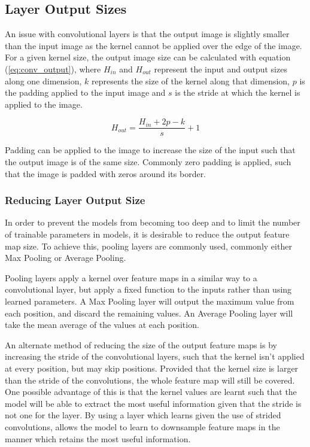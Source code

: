 \subsection{Layer Output Sizes}
An issue with convolutional layers is that the output image is slightly smaller than the input image as the kernel cannot be applied over the edge of the image.
For a given kernel size, the output image size can be calculated with equation (\ref{eq:conv_output}), where $H_{in}$ and $H_{out}$ represent the input and output sizes along one dimension, $k$ represents the size of the kernel along that dimension, $p$ is the padding applied to the input image and $s$ is the stride at which the kernel is applied to the image.

\begin{equation} \label{eq:conv_output}
    H_{out} = \frac{H_{in} + 2p - k}{s} + 1
\end{equation}

Padding can be applied to the image to increase the size of the input such that the output image is of the same size.
Commonly zero padding is applied, such that the image is padded with zeros around its border.

\subsubsection{Reducing Layer Output Size}
In order to prevent the models from becoming too deep and to limit the number of trainable parameters in models, it is desirable to reduce the output feature map size.
To achieve this, pooling layers are commonly used, commonly either Max Pooling or Average Pooling.

Pooling layers apply a kernel over feature maps in a similar way to a convolutional layer, but apply a fixed function to the inputs rather than using learned parameters.
A Max Pooling layer will output the maximum value from each position, and discard the remaining values.
An Average Pooling layer will take the mean average of the values at each position.

An alternate method of reducing the size of the output feature maps is by increasing the stride of the convolutional layers, such that the kernel isn't applied at every position, but may skip positions.
Provided that the kernel size is larger than the stride of the convolutions, the whole feature map will still be covered.
One possible advantage of this is that the kernel values are learnt such that the model will be able to extract the most useful information given that the stride is not one for the layer.
By using a layer which learns given the use of strided convolutions, allows the model to learn to downsample feature maps in the manner which retains the most useful information.

